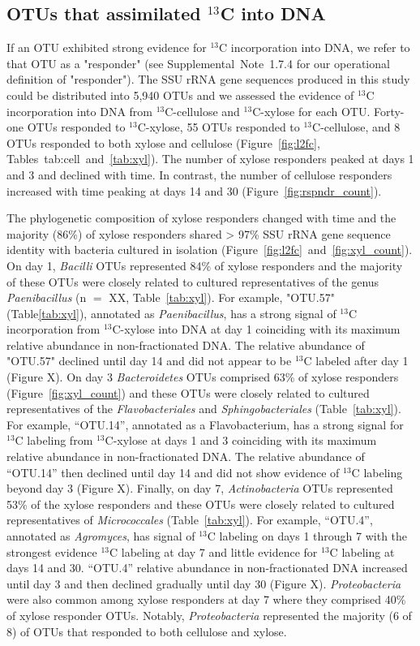 \subsection{OTUs that assimilated $^{13}$C into DNA} \label{responders}
If an OTU exhibited strong evidence for $^{13}$C incorporation into DNA, we
refer to that OTU as a "responder" (see Supplemental Note 1.7.4 for our
operational definition of "responder"). The SSU rRNA gene sequences produced in
this study could be distributed into 5,940 OTUs and we assessed the evidence of
$^{13}$C incorporation into DNA from $^{13}$C-cellulose and
$^{13}$C-xylose for each OTU. Forty-one OTUs responded to $^{13}$C-xylose,
55 OTUs responded to $^{13}$C-cellulose, and 8 OTUs 
responded to both xylose and cellulose (Figure~\ref{fig:l2fc},
Tables~{tab:cell}~and~\ref{tab:xyl}). The number of xylose responders
peaked at days 1 and 3 and declined with time. In contrast, the number of
cellulose responders increased with time peaking at days 14 and 30
(Figure~\ref{fig:rspndr_count}). 

The phylogenetic composition of xylose responders changed with time and the
majority (86\%) of xylose responders shared > 97\% SSU rRNA gene sequence
identity with bacteria cultured in isolation
(Figure~\ref{fig:l2fc}~and~\ref{fig:xyl_count}). On day 1, \textit{Bacilli}
OTUs represented 84\% of xylose responders and the majority of these OTUs were
closely related to cultured representatives of the genus \textit{Paenibacillus}
(n $=$ XX, Table~\ref{tab:xyl}). For example, "OTU.57" (Table\ref{tab:xyl}),
annotated as \textit{Paenibacillus}, has a strong signal of $^{13}$C
incorporation from $^{13}$C-xylose into DNA at day 1 coinciding with its
maximum relative abundance in non-fractionated DNA. The relative abundance
of "OTU.57" declined until day 14 and did not appear to be $^{13}$C
labeled after day 1 (Figure X). On day 3 \textit{Bacteroidetes} OTUs
comprised 63\% of xylose responders (Figure~\ref{fig:xyl_count}) and these
OTUs were closely related to cultured representatives of the
\textit{Flavobacteriales} and \textit{Sphingobacteriales}
(Table~\ref{tab:xyl}). For example, ``OTU.14'', annotated as
a Flavobacterium, has a strong signal for $^{13}$C labeling from
$^{13}$C-xylose at days 1 and 3 coinciding with its maximum relative
abundance in non-fractionated DNA. The relative abundance of ``OTU.14''
then declined until day 14 and did not show evidence of $^{13}$C labeling
beyond day 3 (Figure X). Finally, on day 7, \textit{Actinobacteria} OTUs
represented 53\% of the xylose responders and these OTUs were closely
related to cultured representatives of \textit{Micrococcales}
(Table~\ref{tab:xyl}). For example, ``OTU.4'', annotated as
\textit{Agromyces}, has signal of $^{13}$C labeling on days 1 through
7 with the strongest evidence $^{13}$C labeling at day
7 and little evidence for $^{13}$C labeling at days 14 and 30. ``OTU.4''
relative abundance in non-fractionated DNA increased until day 3 and
then declined gradually until day 30 (Figure X). \textit{Proteobacteria} were
also common among xylose responders at day 7 where they comprised 40\% of
xylose responder OTUs. Notably, \textit{Proteobacteria} represented the
majority (6 of 8) of OTUs that responded to both cellulose and xylose. 

